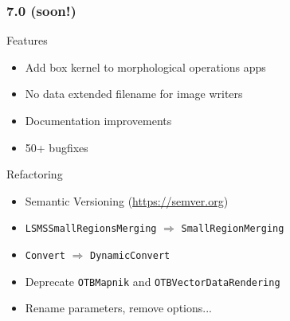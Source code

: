 \begin{frame}
\frametitle{7.0 (soon!)}
\begin{block}{Features}
\begin{itemize}
\item Add box kernel to morphological operations apps
\item No data extended filename for image writers
\item Documentation improvements
\item 50+ bugfixes
\end{itemize}
\end{block}

\begin{block}{Refactoring}
\begin{itemize}
\item Semantic Versioning (\url{https://semver.org})
\item \texttt{LSMSSmallRegionsMerging} $\Rightarrow$ \texttt{SmallRegionMerging}
\item \texttt{Convert} $\Rightarrow$ \texttt{DynamicConvert}
\item Deprecate \texttt{OTBMapnik} and \texttt{OTBVectorDataRendering}
\item Rename parameters, remove options...
\end{itemize}
\end{block}

\end{frame}
